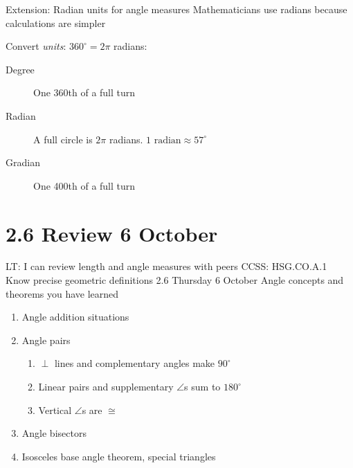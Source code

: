 \begin{frame}{Extension: Radian units for angle measures}
  {Mathematicians use radians because calculations are simpler}
    \begin{center}
    \end{center}
  Convert \emph{units}: $360^\circ = 2 \pi$ radians:
    \begin{description}
      \item[Degree] One 360th of a full turn
      \item[Radian] A full circle is $2\pi$ radians. $1 \text{ radian} \approx 57^\circ$
      \item[Gradian] One 400th of a full turn
    \end{description}
  \end{frame}
  
\section{2.6 Review \hfill 6 October}
\begin{frame}{LT: I can review length and angle measures with peers}
  {CCSS: HSG.CO.A.1 Know precise geometric definitions  \hfill \alert{2.6 Thursday 6 October}}
  Angle concepts and theorems you have learned
  \begin{enumerate}
    \item Angle addition situations
    \item Angle pairs
    \begin{enumerate}
      \item $\perp$ lines and complementary angles make $90^\circ$
      \item Linear pairs and supplementary $\angle$s sum to $180^\circ$
      \item Vertical $\angle$s are $\cong$
    \end{enumerate}
    \item Angle bisectors
    \item Isosceles base angle theorem, special triangles
  \end{enumerate}
\end{frame}

